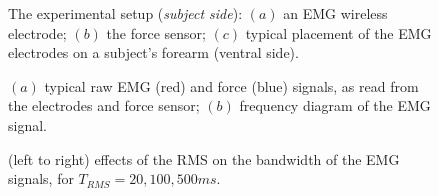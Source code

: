 \documentclass[10pt]{bmc_article}
\def\texttt{[image: ]}
\newenvironment{bmcformat}
  {\begin{raggedright}\baselineskip20pt\sloppy\setboolean{publ}{false}}
  {\end{raggedright}\baselineskip20pt\sloppy}
\begin{document}
\begin{bmcformat}
\begin{figure}[!ht] \centering
  \caption{The experimental setup (\textit{subject side}): $(a)$ an EMG
    wireless electrode; $(b)$ the force sensor; $(c)$ typical
    placement of the EMG electrodes on a subject's forearm (ventral side).}
  \label{fig:SubjSetup}
\end{figure}


\begin{figure}[!ht] \centering
  \caption{$(a)$ typical raw EMG (red) and force (blue) signals, as read from the
    electrodes and force sensor; $(b)$ frequency diagram of the EMG signal.}
  \label{fig:spectra}
\end{figure}

\begin{figure}[!ht] \centering
  \caption{(left to right) effects of the RMS on the bandwidth of the EMG
    signals, for $T_{RMS} = 20, 100, 500ms$.}
  \label{fig:RMSs}
\end{figure}


\end{bmcformat}
\end{document}

